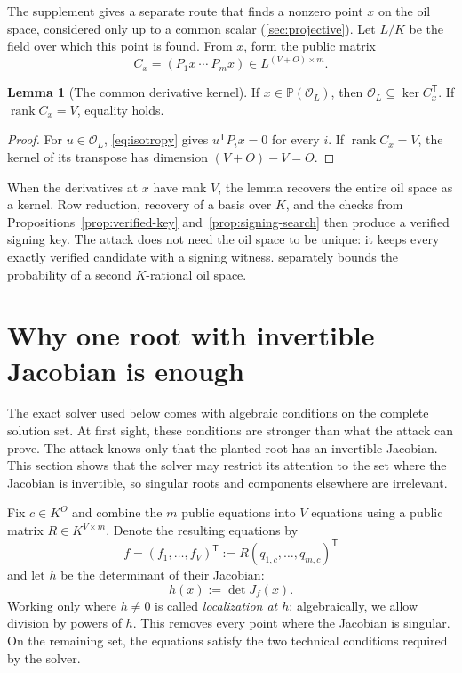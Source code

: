 \documentclass[11pt,a4paper]{article}
\theoremstyle{definition}
\newtheorem{lemma}[theorem]{Lemma}
\theoremstyle{remark}
\newcommand{\PP}{\mathbb P}
\newcommand{\cO}{\mathcal O}
\newcommand{\rank}{\operatorname{rank}}
\newcommand{\trans}{\mathsf T}
\begin{document}
The supplement gives a separate route that finds a nonzero point $x$ on the
oil space, considered only up to a common scalar
(\cref{sec:projective}).  Let $L/K$ be the field over which this point is
found.  From $x$, form the public matrix
\[
C_x=(P_1x\ \cdots\ P_mx)\in L^{(V+O)\times m}.
\]

\begin{lemma}[The common derivative kernel]\label{lem:kernel}
If $x\in\PP(\cO_L)$, then $\cO_L\subseteq\ker C_x^{\trans}$.  If
$\rank C_x=V$, equality holds.
\end{lemma}

\begin{proof}
For $u\in\cO_L$, \eqref{eq:isotropy} gives $u^{\trans}P_ix=0$ for every $i$.
If $\rank C_x=V$, the kernel of its transpose has dimension
$(V+O)-V=O$.
\end{proof}

When the derivatives at $x$ have rank $V$, the lemma recovers the entire oil
space as a kernel.  Row reduction, recovery of a basis over $K$, and the
checks from Propositions~\ref{prop:verified-key}
and~\ref{prop:signing-search}
then produce a verified signing key.  The attack does not need the oil space to
be unique: it keeps every exactly verified candidate with a signing witness.
 separately bounds the probability of a second
$K$-rational oil space.

\section{Why one root with invertible Jacobian is enough}\label{sec:local-geometry}

The exact solver used below comes with algebraic conditions on the complete
solution set.  At first sight, these conditions are stronger than what the
attack can prove.  The attack knows only that the planted root has an
invertible Jacobian.  This section shows that the solver may restrict its
attention to the set where the Jacobian is invertible, so singular roots and
components elsewhere are irrelevant.

Fix $c\in K^O$ and combine the $m$ public equations into $V$ equations using a
public matrix $R\in K^{V\times m}$.  Denote the resulting equations by
\[
 f=(f_1,\ldots,f_V)^{\mathsf T}:=R(q_{1,c},\ldots,q_{m,c})^{\mathsf T}
\]
and let $h$ be the determinant of their Jacobian:
\begin{equation}\label{eq:local-jacobian-polynomial}
 h(x):=\det J_f(x).
\end{equation}
Working only where $h\ne0$ is called \emph{localization at $h$}: algebraically,
we allow division by powers of $h$.  This removes every point where the
Jacobian is singular.  On the remaining set, the equations satisfy the two
technical conditions required by the solver.
\end{document}

